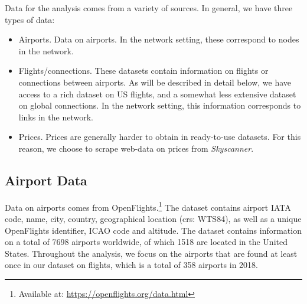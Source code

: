 \label{sec:data}
Data for the analysis comes from a variety of sources.
In general, we have three types of data:
\begin{itemize}
    \item Airports. Data on airports. In the network setting, these correspond to nodes in the network.
    \item Flights/connections. These datasets contain information on flights or connections between airports. As will be described in detail below, we have access to a rich dataset on US flights, and a somewhat less extensive dataset on global connections. In the network setting, this information corresponds to links in the network.
    \item Prices. Prices are generally harder to obtain in ready-to-use datasets. For this reason, we choose to scrape web-data on prices from \textit{Skyscanner}.
\end{itemize}

\subsection{Airport Data}
Data on airports comes from OpenFlights.\footnote{Available at: \url{https://openflights.org/data.html}} The dataset contains airport IATA code, name, city, country, geographical location (crs: WTS84), as well as a unique OpenFlights identifier, ICAO code and altitude. The dataset contains information on a total of 7698 airports worldwide, of which 1518 are located in the United States. Throughout the analysis, we focus on the airports that are found at least once in our dataset on flights, which is a total of 358 airports in 2018.

